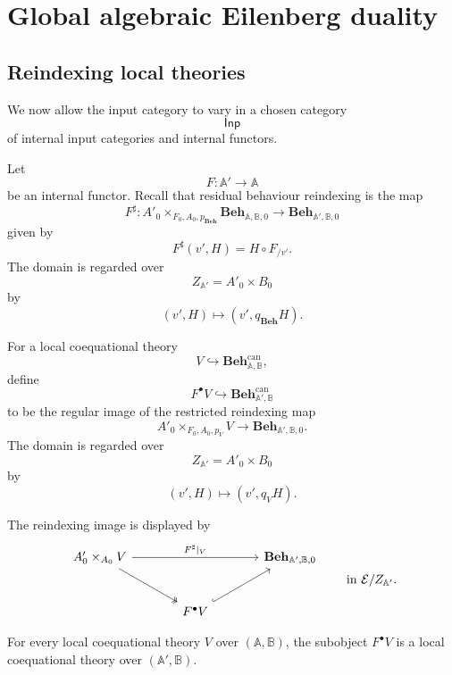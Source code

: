 \section{Global algebraic Eilenberg duality}
\label{sec:global-algebraic-eilenberg-duality}

\subsection{Reindexing local theories}
\label{subsec:to-reindexing-local-theories}

We now allow the input category to vary in a chosen category
\[
    \mathsf{Inp}
\]
of internal input categories and internal functors.

Let
\[
    F:\mathbb A'\to\mathbb A
\]
be an internal functor. Recall that residual behaviour reindexing is the map
\[
    F^\sharp:
    A'_0\times_{F_0,A_0,p_{\mathbf{Beh}}}
    \mathbf{Beh}_{\mathbb A,\mathbb B,0}
    \to
    \mathbf{Beh}_{\mathbb A',\mathbb B,0}
\]
given by
\[
    F^\sharp(v',H)=H\circ F_{/v'}.
\]
The domain is regarded over
\[
    Z_{\mathbb A'}=A'_0\times B_0
\]
by
\[
    (v',H)\longmapsto(v',q_{\mathbf{Beh}}H).
\]

\begin{definition}
\label{def:to-reindexed-local-theory}
    For a local coequational theory
    \[
        V\hookrightarrow
        \mathbf{Beh}^{\mathrm{can}}_{\mathbb A,\mathbb B},
    \]
    define
    \[
        F^\bullet V
        \hookrightarrow
        \mathbf{Beh}^{\mathrm{can}}_{\mathbb A',\mathbb B}
    \]
    to be the regular image of the restricted reindexing map
    \[
        A'_0\times_{F_0,A_0,p_V}V
        \longrightarrow
        \mathbf{Beh}_{\mathbb A',\mathbb B,0}.
    \]
    The domain is regarded over
    \[
        Z_{\mathbb A'}=A'_0\times B_0
    \]
    by
    \[
        (v',H)\longmapsto(v',q_VH).
    \]
\end{definition}

The reindexing image is displayed by
\[
\begin{tikzcd}[column sep=large, row sep=large]
    A'_0\times_{A_0}V
        \arrow[rr, "{F^\sharp|_V}"]
        \arrow[dr, two heads]
    &&
    \mathbf{Beh}_{\mathbb A',\mathbb B,0}
    \\
    &
    F^\bullet V
        \arrow[ur, hook]
    &
\end{tikzcd}
\qquad
\text{in }\mathcal E/Z_{\mathbb A'}.
\]

\begin{lemma}
\label{lem:to-reindexed-theories-local}
    For every local coequational theory \(V\) over \((\mathbb A,\mathbb B)\),
    the subobject \(F^\bullet V\) is a local coequational theory over
    \((\mathbb A',\mathbb B)\).
\end{lemma}

